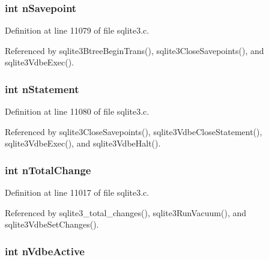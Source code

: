\hypertarget{structsqlite3_a44c5f6cd07e2fa10ce567c1bd86c5189}{}
\subsubsection[{n\+Savepoint}]{\setlength{\rightskip}{0pt plus 5cm}int n\+Savepoint}\label{structsqlite3_a44c5f6cd07e2fa10ce567c1bd86c5189}


Definition at line 11079 of file sqlite3.\+c.



Referenced by sqlite3\+Btree\+Begin\+Trans(), sqlite3\+Close\+Savepoints(), and sqlite3\+Vdbe\+Exec().

\hypertarget{structsqlite3_a8dac02519b317c3d23960862262e03f5}{}
\subsubsection[{n\+Statement}]{\setlength{\rightskip}{0pt plus 5cm}int n\+Statement}\label{structsqlite3_a8dac02519b317c3d23960862262e03f5}


Definition at line 11080 of file sqlite3.\+c.



Referenced by sqlite3\+Close\+Savepoints(), sqlite3\+Vdbe\+Close\+Statement(), sqlite3\+Vdbe\+Exec(), and sqlite3\+Vdbe\+Halt().

\hypertarget{structsqlite3_a99c2d4293f61f6af708629bd69a41fdf}{}
\subsubsection[{n\+Total\+Change}]{\setlength{\rightskip}{0pt plus 5cm}int n\+Total\+Change}\label{structsqlite3_a99c2d4293f61f6af708629bd69a41fdf}


Definition at line 11017 of file sqlite3.\+c.



Referenced by sqlite3\+\_\+total\+\_\+changes(), sqlite3\+Run\+Vacuum(), and sqlite3\+Vdbe\+Set\+Changes().

\hypertarget{structsqlite3_adc871aca341e4606d1e1f805cf6aa7c2}{}
\subsubsection[{n\+Vdbe\+Active}]{\setlength{\rightskip}{0pt plus 5cm}int n\+Vdbe\+Active}\label{structsqlite3_adc871aca341e4606d1e1f805cf6aa7c2}


